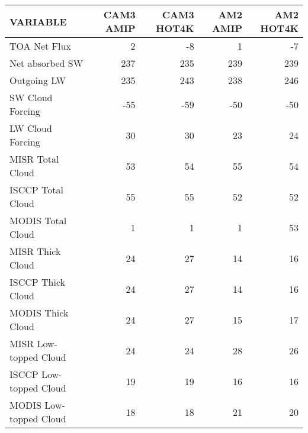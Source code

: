 \begin{tabular}{lrrrr}
\hline
                VARIABLE &                CAM3 AMIP &               CAM3 HOT4K &                 AM2 AMIP &                AM2 HOT4K \\ \hline
            TOA Net Flux &                        2 &                       -8 &                        1 &                       -7 \\
         Net absorbed SW &                      237 &                      235 &                      239 &                      239 \\
             Outgoing LW &                      235 &                      243 &                      238 &                      246 \\
        SW Cloud Forcing &                      -55 &                      -59 &                      -50 &                      -50 \\
        LW Cloud Forcing &                       30 &                       30 &                       23 &                       24 \\
        MISR Total Cloud &                       53 &                       54 &                       55 &                       54 \\
       ISCCP Total Cloud &                       55 &                       55 &                       52 &                       52 \\
       MODIS Total Cloud &                        1 &                        1 &                        1 &                       53 \\
        MISR Thick Cloud &                       24 &                       27 &                       14 &                       16 \\
       ISCCP Thick Cloud &                       24 &                       27 &                       14 &                       16 \\
       MODIS Thick Cloud &                       24 &                       27 &                       15 &                       17 \\
   MISR Low-topped Cloud &                       24 &                       24 &                       28 &                       26 \\
  ISCCP Low-topped Cloud &                       19 &                       19 &                       16 &                       16 \\
  MODIS Low-topped Cloud &                       18 &                       18 &                       21 &                       20 \\

\end{tabular}
